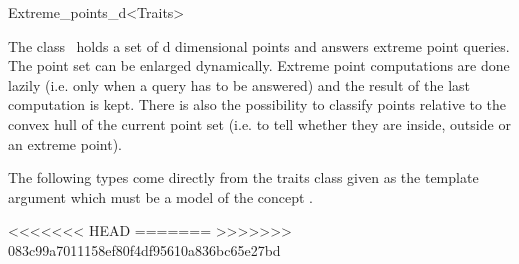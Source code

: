 \ccRefPageBegin


\begin{ccRefClass}{Extreme_points_d<Traits>}  %


\ccDefinition
  
The class \ccRefName\ holds a set of d dimensional points and answers extreme point queries. The point set can be 
enlarged dynamically. Extreme point computations are done lazily (i.e. only when a query has to be answered) and the result of the last computation is kept. There is also the possibility to classify points relative to the convex hull of the current point set (i.e. to tell whether they are inside, outside or an extreme point). 


% 

\ccTypes

The following types come directly from the traits class given as the template argument which must be a model of the concept .


<<<<<<< HEAD
\ccCreation %
=======
\ccCreation
{}  %
>>>>>>> 083c99a7011158ef80f4df95610a836bc65e27bd



\end{ccRefClass}
